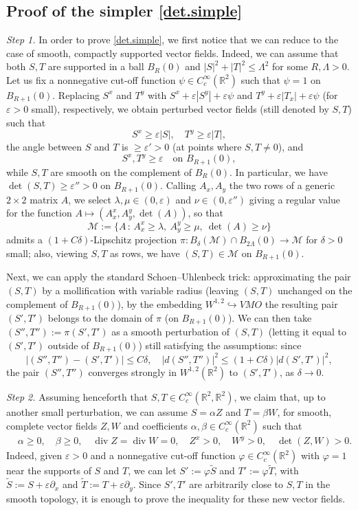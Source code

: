 \documentclass[11pt,a4paper]{amsart}
\newcommand{\R}{\mathbb{R}}
\newcommand{\de}{\partial}
\renewcommand{\phi}{\varphi}
\theoremstyle{definition}
\DeclareMathOperator{\dive}{div}
\renewcommand{\epsilon}{\varepsilon}
\begin{document}
\subsection{Proof of the simpler \cref{det.simple}}
\emph{Step 1.} In order to prove \cref{det.simple}, we first notice that we can reduce to the case of smooth, compactly supported vector fields. Indeed, we can assume that both $S,T$
are supported in a ball $B_R(0)$ and $|S|^2+|T|^2\le\Lambda^2$ for some $R,\Lambda>0$. Let us fix a nonnegative cut-off function $\psi\in C^\infty_c(\R^2)$
such that $\psi=1$ on $B_{R+1}(0)$. Replacing $S^x$ and $T^y$ with $S^x+\epsilon|S^y|+\epsilon\psi$
and $T^y+\epsilon|T_x|+\epsilon\psi$ (for $\epsilon>0$ small), respectively, we obtain perturbed vector fields (still denoted by $S,T$) such that
$$S^x\ge\epsilon|S|,\quad T^y\ge\epsilon|T|,$$
the angle between $S$ and $T$ is $\ge\epsilon'>0$
(at points where $S,T\neq0$), and
$$S^x,T^y\ge\epsilon\quad\text{on $B_{R+1}(0)$},$$
while $S,T$ are smooth on the complement of $B_R(0)$. In particular, we have $\det(S,T)\ge\epsilon''>0$
on $B_{R+1}(0)$.
Calling $A_x,A_y$ the two rows of a generic $2\times 2$ matrix $A$,
we select $\lambda,\mu\in(0,\epsilon)$ and $\nu\in(0,\epsilon'')$ giving a regular value for the function
$A\mapsto(A_x^x,A_y^y,\det(A))$, so that
$$\mathcal{M}:=\{A\,:\,A_x^x\ge\lambda,\ A_y^y\ge\mu,\ \det(A)\ge\nu\}$$
admits a $(1+C\delta)$-Lipschitz projection $\pi:B_\delta(\mathcal{M})\cap B_{2\Lambda}(0)\to\mathcal{M}$
for $\delta>0$ small; also, viewing $S,T$ as rows, we have $(S,T)\in\mathcal{M}$ on $B_{R+1}(0)$.

Next, we can apply the standard Schoen--Uhlenbeck trick: approximating the pair $(S,T)$ by a mollification with variable radius (leaving $(S,T)$ unchanged on the complement of $B_{R+1}(0)$), by the embedding $W^{1,2}\hookrightarrow VMO$ the resulting pair $(S',T')$ belongs to the domain of $\pi$ (on $B_{R+1}(0)$). We can then take $(S'',T''):=\pi(S',T')$ as a smooth perturbation
of $(S,T)$ (letting it equal to $(S',T')$ outside of $B_{R+1}(0)$) still satisfying the assumptions:
since
$$|(S'',T'')-(S',T')|\le C\delta,\quad|d(S'',T'')|^2\le (1+C\delta)|d(S',T')|^2,$$
the pair $(S'',T'')$ converges strongly in $W^{1,2}(\R^2)$ to $(S',T')$,
as $\delta\to0$.

\emph{Step 2.} Assuming henceforth that $S,T\in C^\infty_c(\R^2,\R^2)$, we claim that, up to another small perturbation, we can assume $S=\alpha Z$ and $T=\beta W$, for smooth, complete vector fields $Z,W$ and coefficients $\alpha,\beta\in C^\infty_c(\R^2)$ such that
\begin{align}\label{positive}
	&\alpha\ge0,\quad\beta\ge0,\quad\dive Z=\dive W=0,\quad Z^x>0,\quad W^y>0,\quad\det(Z,W)>0.
\end{align}
Indeed, given $\epsilon>0$ and a nonnegative cut-off function $\phi\in C^\infty_c(\R^2)$ with $\phi=1$ near the supports of $S$ and $T$, we can let $S':=\phi\tilde S$ and $T':=\phi\tilde T$, with $\tilde S:=S+\epsilon\de_x$ and $\tilde T:=T+\epsilon\de_y$.
Since $S',T'$ are arbitrarily close to $S,T$ in the smooth topology, it is enough to prove the inequality for these new vector fields.
\end{document}
